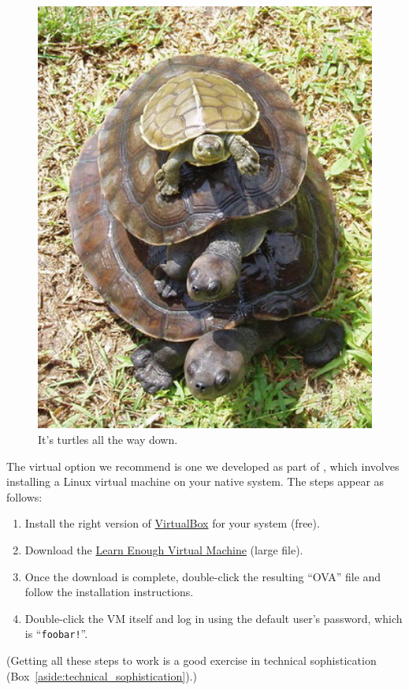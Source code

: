 \begin{figure}
\begin{center}
\includegraphics[width=5.5in]{images/figures/turtles.jpg}
\end{center}
\caption{It's turtles all the way down.\label{fig:turtles}}
\end{figure}

The virtual option we recommend is one we developed as part of \lecl, which involves installing a Linux virtual machine on your native system. The steps appear as follows:
\begin{enumerate}
\item Install the right version of \href{https://www.virtualbox.org/}{VirtualBox} for your system (free).
\item Download the \href{https://softcover-static.s3.amazonaws.com/LearnEnough-v.1.4.ova}{Learn Enough Virtual Machine} (large file).
\item Once the download is complete, double-click the resulting ``OVA'' file and follow the installation instructions.
\item Double-click the VM itself and log in using the default user's password, which is ``\texttt{foobar!}''.
\end{enumerate}
(Getting all these steps to work is a good exercise in technical sophistication (Box~\ref{aside:technical_sophistication}).)

